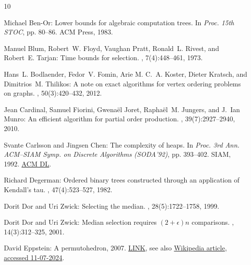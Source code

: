 \documentclass[11pt]{article}
\numberwithin{equation}{section}
\theoremstyle{definition}
\theoremstyle{plain}
\begin{document}
\tocrefpdfbookmark
\begin{thebibliography}{10}

{\sc Michael Ben-Or}: Lower bounds for algebraic computation trees.
\newblock In {\em Proc. 15th STOC}, pp. 80--86. ACM Press, 1983.
\newblock [\epfmtdoi{10.1145/800061.808735}]

{\sc Manuel Blum, Robert~W. Floyd, Vaughan Pratt, Ronald~L. Rivest, and
  Robert~E. Tarjan}: Time bounds for selection.
, 7(4):448--461, 1973.
\newblock [\epfmtdoi{10.1016/S0022-0000(73)80033-9}]

{\sc Hans~L. Bodlaender, Fedor~V. Fomin, Arie M. C.~A. Koster, Dieter Kratsch,
  and Dimitrios~M. Thilikos}: A note on exact algorithms for vertex ordering
  problems on graphs.
, 50(3):420--432, 2012.
\newblock [\epfmtdoi{10.1007/s00224-011-9312-0}]

{\sc Jean Cardinal, Samuel Fiorini, Gwena\"{e}l Joret, Rapha\"{e}l~M. Jungers,
  and J.~Ian Munro}: An efficient algorithm for partial order production.
, 39(7):2927--2940, 2010.
\newblock [\epfmtdoi{10.1137/090759860}]

{\sc Svante Carlsson and Jingsen Chen}: The complexity of heaps.
\newblock In {\em Proc. 3rd Ann. ACM--SIAM Symp. on Discrete Algorithms
  (SODA'92)}, pp. 393--402. SIAM, 1992.
\newblock \href{https://dl.acm.org/doi/10.5555/139404.139483}{ACM DL}.

{\sc Richard Degerman}: Ordered binary trees constructed through an application
  of {K}endall's tau.
, 47(4):523--527, 1982.
\newblock [\epfmtdoi{10.1007/BF02293713}]

{\sc Dorit Dor and Uri Zwick}: Selecting the median.
, 28(5):1722--1758, 1999.
\newblock [\epfmtdoi{10.1137/S0097539795288611}]

{\sc Dorit Dor and Uri Zwick}: Median selection requires $(2+\epsilon)n$
  comparisons.
, 14(3):312--325, 2001.
\newblock [\epfmtdoi{10.1137/S0895480199353895}]

{\sc David Eppstein}: A permutohedron, 2007.
\newblock \href{https://en.m.wikipedia.org/wiki/File:Permutohedron.svg}{LINK},
  see also \href{https://en.wikipedia.org/wiki/Permutohedron}{Wikipedia
  article, accessed 11-07-2024}.


\end{thebibliography}
\end{document}

